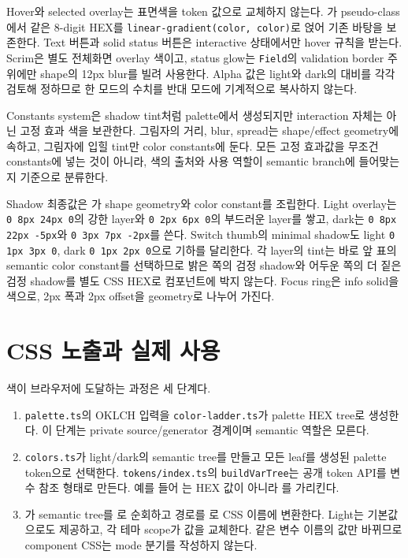 \documentclass[11pt,titlepage]{article}
\begin{document}
Hover와 selected overlay는 표면색을 token 값으로 교체하지 않는다. 가 pseudo-class에서 같은 8-digit HEX를 \texttt{linear-gradient(color, color)}로 얹어 기존 바탕을 보존한다. Text 버튼과 solid status 버튼은 interactive 상태에서만 hover 규칙을 받는다. Scrim은 별도 전체화면 overlay 색이고, status glow는 \texttt{Field}의 validation border 주위에만 shape의 12px blur를 빌려 사용한다. Alpha 값은 light와 dark의 대비를 각각 검토해 정하므로 한 모드의 수치를 반대 모드에 기계적으로 복사하지 않는다.

Constants system은 shadow tint처럼 palette에서 생성되지만 interaction 자체는 아닌 고정 효과 색을 보관한다. 그림자의 거리, blur, spread는 shape/effect geometry에 속하고, 그림자에 입힐 tint만 color constants에 둔다. 모든 고정 효과값을 무조건 constants에 넣는 것이 아니라, 색의 출처와 사용 역할이 semantic branch에 들어맞는지 기준으로 분류한다.

Shadow 최종값은 가 shape geometry와 color constant를 조립한다. Light overlay는 \texttt{0 8px 24px 0}의 강한 layer와 \texttt{0 2px 6px 0}의 부드러운 layer를 쌓고, dark는 \texttt{0 8px 22px -5px}와 \texttt{0 3px 7px -2px}를 쓴다. Switch thumb의 minimal shadow도 light \texttt{0 1px 3px 0}, dark \texttt{0 1px 2px 0}으로 기하를 달리한다. 각 layer의 tint는 바로 앞 표의 semantic color constant를 선택하므로 밝은 쪽의 검정 shadow와 어두운 쪽의 더 짙은 검정 shadow를 별도 CSS HEX로 컴포넌트에 박지 않는다. Focus ring은 info solid을 색으로, 2px 폭과 2px offset을 geometry로 나누어 가진다.

\section{CSS 노출과 실제 사용}

색이 브라우저에 도달하는 과정은 세 단계다.

\begin{enumerate}
\item \texttt{palette.ts}의 OKLCH 입력을 \texttt{color-ladder.ts}가 palette HEX tree로 생성한다. 이 단계는 private source/generator 경계이며 semantic 역할은 모른다.
\item \texttt{colors.ts}가 light/dark의 semantic tree를 만들고 모든 leaf를 생성된 palette token으로 선택한다. \texttt{tokens/index.ts}의 \texttt{buildVarTree}는 공개 token API를 변수 참조 형태로 만든다. 예를 들어 는 HEX 값이 아니라 를 가리킨다.
\item {}가 semantic tree를 로 순회하고 경로를 로 CSS 이름에 변환한다. Light는  기본값으로도 제공하고, 각 테마 scope가 값을 교체한다. 같은 변수 이름의 값만 바뀌므로 component CSS는 mode 분기를 작성하지 않는다.
\end{enumerate}
\end{document}
